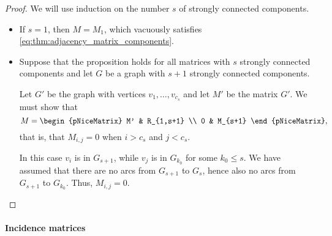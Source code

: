 \begin{proof}
  We will use induction on the number \( s \) of strongly connected components.
  \begin{itemize}
    \item If \( s = 1 \), then \( M = M_1 \), which vacuously satisfies \eqref{eq:thm:adjacency_matrix_components}.
    \item Suppose that the proposition holds for all matrices with \( s \) strongly connected components and let \( G \) be a graph with \( s + 1 \) strongly connected components.

    Let \( G' \) be the graph with vertices \( v_1, \ldots, v_{c_s} \) and let \( M' \) be the matrix \( G' \). We must show that
    \begin{equation*}
      M = \begin{pNiceMatrix}
        M' & R_{1,s+1} \\
        0  & M_{s+1}
      \end{pNiceMatrix},
    \end{equation*}
    that is, that \( M_{i,j} = 0 \) when \( i > c_s \) and \( j < c_s \).

    In this case \( v_i \) is in \( G_{s+1} \), while \( v_j \) is in \( G_{k_0} \) for some \( k_0 \leq s \). We have assumed that there are no arcs from \( G_{s+1} \) to \( G_s \), hence also no arcs from \( G_{s+1} \) to \( G_{k_0} \). Thus, \( M_{i,j} = 0 \).
  \end{itemize}
\end{proof}

\paragraph{Incidence matrices}

